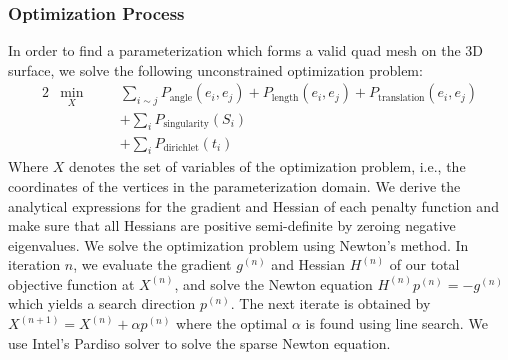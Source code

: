 \subsubsection{Optimization Process}
In order to find a parameterization which forms a valid quad mesh on the 3D surface, we solve the following unconstrained optimization problem:
\begin{alignat}{2}
  &\min_{X}
     &\quad & \sum_{i \sim j} P_{\mathrm{angle}}\left(e_i,e_j\right) + P_{\mathrm{length}}\left(e_i,e_j\right) + P_{\mathrm{translation}}\left(e_i,e_j\right) \nonumber\\ 
  &  &  & + \sum_{i} P_{\mathrm{singularity}}\left(S_i\right) \nonumber\\ 
  &  &  & + \sum_{i} P_{\mathrm{dirichlet}}\left(t_i\right) \nonumber
\end{alignat}
Where $X$ denotes the set of variables of the optimization problem, i.e., the coordinates of the vertices in the parameterization domain. We derive the analytical expressions for the gradient and Hessian of each penalty function and make sure that all Hessians are positive semi-definite by zeroing negative eigenvalues. We solve the optimization problem using Newton's method. In iteration $n$, we evaluate the gradient $g^{(n)}$ and Hessian $H^{(n)}$ of our total objective function at $X^{(n)}$, and solve the Newton equation $H^{(n)}p^{(n)}=-g^{(n)}$ which yields a search direction $p^{(n)}$. The next iterate is obtained by $X^{(n+1)} = X^{(n)} + \alpha p^{(n)}$ where the optimal $\alpha$ is found using line search. We use Intel's Pardiso solver to solve the sparse Newton equation.
